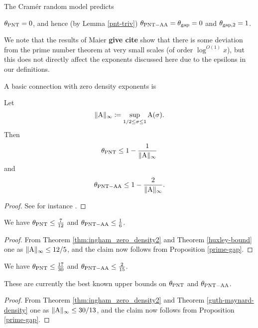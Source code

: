 The Cram\'er random model \cite{cramer} predicts

\begin{conjecture} $\theta_{\mathrm{PNT}} = 0$, and hence (by Lemma \ref{pnt-triv}) $\theta_{\mathrm{PNT-AA}} = \theta_{\mathrm{gap}}=0$ and $\theta_{\mathrm{gap},2}=1$.
\end{conjecture}

We note that the results of Maier {\bf give cite} show that there is some deviation from the prime number theorem at very small scales (of order $\log^{O(1)} x$), but this does not directly affect the exponents discussed here due to the epsilons in our definitions.

A basic connection with zero density exponents is

\begin{proposition}\label{prime-gap}  Let
\begin{equation}\label{A-def}
    \|\mathrm{A}\|_\infty \coloneqq \sup_{1/2 \leq \sigma \leq 1} \mathrm{A}(\sigma).
\end{equation}
Then
    $$ \theta_{\mathrm{PNT}} \leq 1 - \frac{1}{\|\mathrm{A}\|_\infty}$$
    and
    $$ \theta_{\mathrm{PNT-AA}} \leq 1 - \frac{2}{\|\mathrm{A}\|_\infty}.$$
\end{proposition}

\begin{proof} See for instance \cite[\S 13.2]{guth-maynard}.
\end{proof}

\begin{corollary}  We have $\theta_{\mathrm{PNT}} \leq \frac{7}{12}$ and $\theta_{\mathrm{PNT-AA}} \leq \frac{1}{6}$.
\end{corollary}

\begin{proof}  From Theorem \ref{thm:ingham_zero_density2} and Theorem \ref{huxley-bound} one as $\|\mathrm{A}\|_\infty \leq 12/5$, and the claim now follows from Proposition \ref{prime-gap}.
\end{proof}

\begin{corollary}\cite{guth-maynard}  We have $\theta_{\mathrm{PNT}} \leq \frac{17}{30}$ and $\theta_{\mathrm{PNT-AA}} \leq \frac{2}{15}$.
\end{corollary}

These are currently the best known upper bounds on $\theta_{\mathrm{PNT}}$ and $\theta_{\mathrm{PNT-AA}}$.

\begin{proof}  From Theorem \ref{thm:ingham_zero_density2} and Theorem \ref{guth-maynard-density} one as $\|\mathrm{A}\|_\infty \leq 30/13$, and the claim now follows from Proposition \ref{prime-gap}.
\end{proof}


